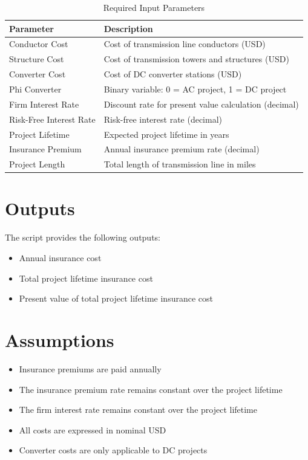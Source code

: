 \documentclass[12pt]{article}
\begin{document}
\begin{table}[H]
\centering
\caption{Required Input Parameters}
\begin{tabular}{@{}ll@{}}
\toprule
\textbf{Parameter} & \textbf{Description} \\
\midrule
Conductor Cost & Cost of transmission line conductors (USD) \\
Structure Cost & Cost of transmission towers and structures (USD) \\
Converter Cost & Cost of DC converter stations (USD) \\
Phi Converter & Binary variable: 0 = AC project, 1 = DC project \\
Firm Interest Rate & Discount rate for present value calculation (decimal) \\
Risk-Free Interest Rate & Risk-free interest rate (decimal) \\
Project Lifetime & Expected project lifetime in years \\
Insurance Premium & Annual insurance premium rate (decimal) \\
Project Length & Total length of transmission line in miles \\
\bottomrule
\end{tabular}
\end{table}

\section{Outputs}

The script provides the following outputs:
\begin{itemize}
    \item Annual insurance cost
    \item Total project lifetime insurance cost
    \item Present value of total project lifetime insurance cost
\end{itemize}

\section{Assumptions}

\begin{itemize}
    \item Insurance premiums are paid annually
    \item The insurance premium rate remains constant over the project lifetime
    \item The firm interest rate remains constant over the project lifetime
    \item All costs are expressed in nominal USD
    \item Converter costs are only applicable to DC projects
\end{itemize}
\end{document}

